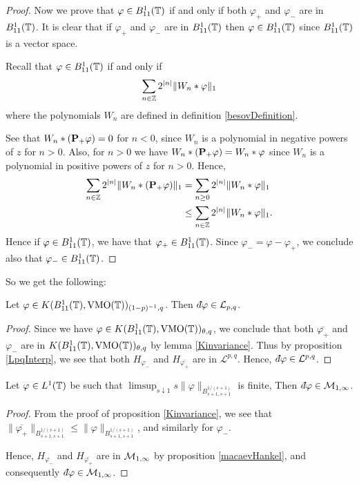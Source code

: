 \begin{proof}
    Now we prove that $\varphi \in B_{11}^1(\mathbb{T})$ if and only if both
    $\varphi_+$ and $\varphi_-$ are in $B_{11}^1(\mathbb{T})$. It is clear
    that if $\varphi_+$ and $\varphi_-$ are in $B_{11}^1(\mathbb{T})$ 
    then $\varphi \in B_{11}^1(\mathbb{T})$ since $B_{11}^1(\mathbb{T})$ is a vector space.
    
    Recall that $\varphi \in B_{11}^1(\mathbb{T})$ if and only if 
    \begin{equation}
        \sum_{n\in \mathbb{Z}} 2^{|n|} \|W_n*\varphi\|_1
    \end{equation}
    where the polynomials $W_n$ are defined in definition \ref{besovDefinition}.
    
    See that $W_n*(\mathbf{P}_+\varphi) = 0$ for $n < 0$, since $W_n$ is a polynomial
    in negative powers of $z$ for $n > 0$. Also, for $n > 0$ we
    have $W_n * (\mathbf{P}_+\varphi) = W_n*\varphi$ since $W_n$ is a polynomial
    in positive powers of $z$ for $n > 0$.
    Hence,
    \begin{align}
        \sum_{n\in \mathbb{Z}} 2^{|n|}\|W_n * (\mathbf{P}_+\varphi)\|_1 &= \sum_{n\geq 0} 2^{|n|} \|W_n*\varphi\|_1\\
        &\leq \sum_{n \in \mathbb{Z}} 2^{|n|}\|W_n*\varphi\|_1.
    \end{align}
    Hence if $\varphi \in B_{11}^1(\mathbb{T})$, we have that $\varphi_+ \in B_{11}^1(\mathbb{T})$.
    Since $\varphi_- = \varphi-\varphi_+$, we conclude also that $\varphi_- \in B_{11}^1(\mathbb{T})$.
\end{proof}
    
So we get the following:
\begin{corollary}
    Let $\varphi\in K(B_{11}^1(\mathbb{T}),\operatorname{VMO}(\mathbb{T}))_{(1-p)^{-1},q}$. Then $\qd \varphi \in \mathcal{L}_{p,q}$. 
\end{corollary}
\begin{proof}
    Since we have $\varphi \in K(B_{11}^1(\mathbb{T}),\operatorname{VMO}(\mathbb{T}))_{\theta,q}$, we
    conclude that both $\overline{\varphi_+}$ and $\varphi_-$
    are in $K(B_{11}^1(\mathbb{T}),\operatorname{VMO}(\mathbb{T}))_{\theta,q}$ by lemma \ref{Kinvariance}.
    Thus by proposition \ref{LpqInterp}, we see that both $H_{\varphi_-}$
    and $H_{\overline{\varphi_+}}$ are in $\mathcal{L}^{p,q}$.
    Hence, $\qd \varphi \in \mathcal{L}^{p,q}$.
\end{proof}

\begin{proposition}
    Let $\varphi \in L^1(\mathbb{T})$ be such that $\limsup_{s\downarrow 1} s\|\varphi\|_{B_{s+1,s+1}^{1/(s+1)}}$
    is finite, Then $\qd \varphi \in \mathcal{M}_{1,\infty}$.
\end{proposition}
\begin{proof}
    From the proof of proposition \ref{Kinvariance}, we see that $\|\overline{\varphi_+}\|_{B_{s+1,s+1}^{1/(s+1)}} \leq \|\varphi\|_{B_{s+1,s+1}^{1/(s+1)}}$,
    and similarly for $\varphi_-$.
    
    Hence, $H_{\varphi_-}$ and $H_{\overline{\varphi_+}}$ are in $\mathcal{M}_{1,\infty}$
    by proposition \ref{macaevHankel}, and consequently $\qd \varphi \in \M_{1,\infty}$.
\end{proof}

